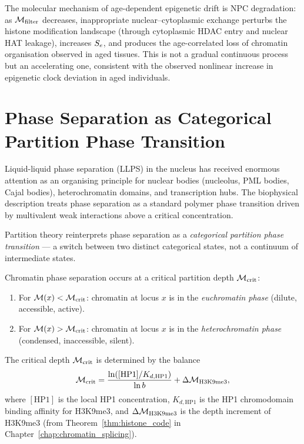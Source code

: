 \begin{corollary}
\label{cor:epigenetic_drift}
The molecular mechanism of age-dependent epigenetic drift is NPC degradation:
as $\mathcal{M}_{\mathrm{filter}}$ decreases, inappropriate nuclear--cytoplasmic
exchange perturbs the histone modification landscape (through cytoplasmic HDAC
entry and nuclear HAT leakage), increases $S_e$, and produces the
age-correlated loss of chromatin organisation observed in aged tissues.
This is not a gradual continuous process but an accelerating one, consistent
with the observed nonlinear increase in epigenetic clock deviation in aged
individuals.
\end{corollary}

\section{Phase Separation as Categorical Partition Phase Transition}
\label{sec:phase_separation}

Liquid-liquid phase separation (LLPS) in the nucleus has received enormous
attention as an organising principle for nuclear bodies (nucleolus, PML
bodies, Cajal bodies), heterochromatin domains, and transcription hubs. The
biophysical description treats phase separation as a standard polymer
phase transition driven by multivalent weak interactions above a
critical concentration.

Partition theory reinterprets phase separation as a \emph{categorical partition
phase transition} --- a switch between two distinct categorical states, not a
continuum of intermediate states.

\begin{theorem}
\label{thm:phase_separation}
Chromatin phase separation occurs at a critical partition depth $\mathcal{M}_{\mathrm{crit}}$:
\begin{enumerate}[label=(\roman*)]
  \item For $\mathcal{M}(x) < \mathcal{M}_{\mathrm{crit}}$: chromatin at locus $x$ is
        in the \emph{euchromatin phase} (dilute, accessible, active).
  \item For $\mathcal{M}(x) > \mathcal{M}_{\mathrm{crit}}$: chromatin at locus $x$ is
        in the \emph{heterochromatin phase} (condensed, inaccessible, silent).
\end{enumerate}
The critical depth $\mathcal{M}_{\mathrm{crit}}$ is determined by the balance
\begin{equation}
  \mathcal{M}_{\mathrm{crit}} = \frac{\ln([\mathrm{HP1}]/K_{d,\mathrm{HP1}})}{\ln b}
  + \Delta\mathcal{M}_{\mathrm{H3K9me3}},
  \label{eq:phase_crit_depth}
\end{equation}
where $[\mathrm{HP1}]$ is the local HP1 concentration, $K_{d,\mathrm{HP1}}$
is the HP1 chromodomain binding affinity for H3K9me3, and
$\Delta\mathcal{M}_{\mathrm{H3K9me3}}$ is the depth increment of H3K9me3
(from Theorem~\ref{thm:histone_code} in Chapter~\ref{chap:chromatin_splicing}).
\end{theorem}

